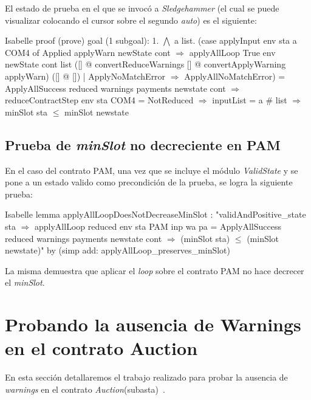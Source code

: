 \documentclass[12pt]{book}
\begin{document}
El estado de prueba en el que se invocó a \textit{Sledgehammer} (el cual se puede visualizar colocando el cursor sobre el segundo \textit{auto}) es el siguiente:

\begin{code}[title=Estado parcial del lemma de \textit{minSlot} no decreciente para el contrato COM.]{Isabelle}
proof (prove)
goal (1 subgoal):
 1. $\bigwedge$ a list.
       (case applyInput env sta a COM4 of
        Applied applyWarn newState cont $\Rightarrow$
          applyAllLoop True env newState cont list
           ([] @
            convertReduceWarnings [] @
            convertApplyWarning applyWarn)
           ([] @ [])
        | ApplyNoMatchError $\Rightarrow$
            ApplyAllNoMatchError) =
       ApplyAllSuccess reduced warnings payments
        newstate cont $\Longrightarrow$
       reduceContractStep env sta COM4 =
       NotReduced $\Longrightarrow$
       inputList = a # list $\Longrightarrow$
       minSlot sta $\leq$ minSlot newstate
\end{code}

\subsection{Prueba de \textit{minSlot} no decreciente en PAM}

En el caso del contrato PAM, una vez que se incluye el módulo \textit{ValidState} y se pone a un estado valido como precondición de la prueba, se logra la siguiente prueba:

\begin{code}[title=Prueba del lema de \textit{minSlot} para el contrato PAM]{Isabelle}
lemma applyAllLoopDoesNotDecreaseMinSlot :
"validAndPositive_state sta $\Longrightarrow$
  applyAllLoop reduced env sta PAM inp wa pa = 
  ApplyAllSuccess reduced warnings payments newstate cont $\Longrightarrow$
  (minSlot sta) $\leq$ (minSlot newstate)"
    by (simp add: applyAllLoop_preserves_minSlot)
\end{code}

La misma demuestra que aplicar el \textit{loop} sobre el contrato PAM no hace decrecer el \textit{minSlot}.

\section{Probando la ausencia de Warnings en el contrato Auction}

En esta sección detallaremos el trabajo realizado para probar la ausencia de \textit{warnings} en el contrato \textit{Auction}(subasta)~\cite{auction_haskell}.
\end{document}
